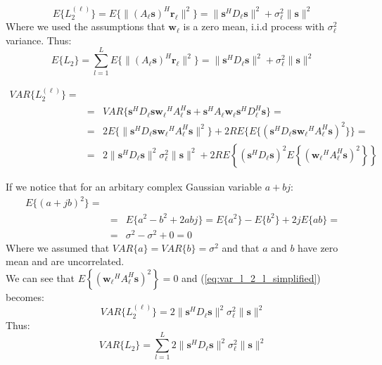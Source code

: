 \documentclass[10pt,a4paper]{report}
\begin{document}
\begin{equation}
E\{L_2^{(\ell)}\}=E\{\|(A_\ell\mathbf{s})^H\mathbf{r_\ell}\|^2\}= \|\mathbf{s}^H D_\ell \mathbf{s}\|^2 + \sigma_\ell^2\|\mathbf{s}\|^2
\end{equation}
Where we used the assumptions that $\mathbf{w_\ell}$ is a zero mean, i.i.d process with $\sigma_\ell^2$ variance.
Thus:
\begin{equation}
E\{L_2\}=\sum_{l=1}^L E\{\|(A_\ell\mathbf{s})^H\mathbf{r_\ell}\|^2\}= \|\mathbf{s}^H D_\ell \mathbf{s}\|^2 + \sigma_\ell^2\|\mathbf{s}\|^2
\end{equation}

\begin{eqnarray}
\label{eq:var_l_2_l_simplified}
VAR\{L_2^{(\ell)}\} = \\
&=&VAR\{ \mathbf{s}^H D_\ell \mathbf{s}\mathbf{w_\ell}^H A_\ell^H \mathbf{s} + \mathbf{s}^H A_\ell \mathbf{w_\ell}\mathbf{s}^H D_\ell^H \mathbf{s}\} = \nonumber\\
&=&2E\{\| \mathbf{s}^H D_\ell \mathbf{s}\mathbf{w_\ell}^H A_\ell^H \mathbf{s} \|^2 \} + 2RE \{E\{(\mathbf{s}^H D_\ell \mathbf{s}\mathbf{w_\ell}^H A_\ell^H \mathbf{s})^2 \}\} =  \nonumber \\
&=&2\| \mathbf{s}^H D_\ell \mathbf{s}\|^2\sigma_\ell^2\|\mathbf{s}\|^2 +2 RE \left\{(\mathbf{s}^H D_\ell \mathbf{s})^2 E\left\{(\mathbf{w_\ell}^H A_\ell^H \mathbf{s})^2\right\}\right\} \nonumber
\end{eqnarray}

If we notice that for an arbitary complex Gaussian variable $a+bj$:
\begin{eqnarray*}
E\{(a+jb)^2\} = \\
&=& E\{a^2-b^2+2abj \}= E\{a^2\}-E\{b^2\} +2jE\{ab\}= \\
&=& \sigma^2-\sigma^2+0 = 0
\end{eqnarray*}
Where we assumed that $VAR\{a\} = VAR \{b\} = \sigma^2$ and that $a$ and $b$ have zero mean and are uncorrelated.\\
We can see that $E\left\{(\mathbf{w_\ell}^H A_\ell^H \mathbf{s})^2\right\}=0$  and (\ref{eq:var_l_2_l_simplified})
becomes:
\begin{equation}
VAR\{L_2^{(\ell)}\} =2\| \mathbf{s}^H D_\ell \mathbf{s}\|^2\sigma_\ell^2\|\mathbf{s}\|^2 
\end{equation}
Thus:
\begin{equation}
VAR\{L_2\} = \sum_{l=1}^L 2\| \mathbf{s}^H D_\ell \mathbf{s}\|^2\sigma_\ell^2\|\mathbf{s}\|^2 
\end{equation}
\end{document}
